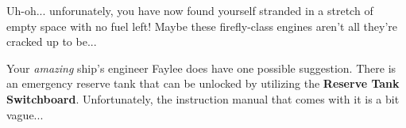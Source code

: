 Uh-oh... unforunately, you have now found yourself stranded
in a stretch of empty space with no fuel left! Maybe these firefly-class
engines aren't all they're cracked up to be...

Your \textit{amazing} ship's engineer Faylee does have one possible suggestion. There is
an emergency reserve tank that can be unlocked by utilizing the
\textbf{Reserve Tank Switchboard}. Unfortunately, the instruction manual
that comes with it is a bit vague...

\begin{center}
\end{center} 
